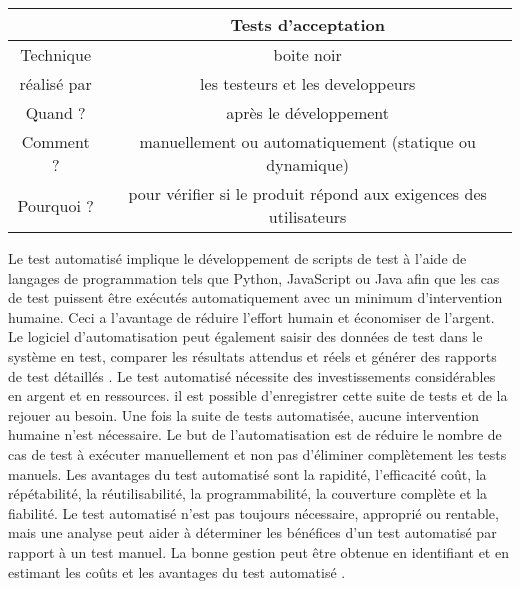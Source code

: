 \label{sec:criteres}
\begin{center}
    

\begin{tabular}{|c|c|}
    
    \hline
    \hline
    & Tests d'acceptation  \\ \hline
    Technique & boite noir \\ \hline
    réalisé par & les testeurs et les developpeurs \\ \hline
    Quand ? & après le développement \\ \hline
    Comment ? & manuellement ou automatiquement (statique ou dynamique) \\ \hline
    Pourquoi ? & pour vérifier si le produit répond aux exigences des utilisateurs \\ \hline
    \hline
\end{tabular}
\end{center}
Le test automatisé implique le développement de scripts de test à l'aide de langages de programmation tels que Python, JavaScript ou Java afin que les cas de test puissent être exécutés automatiquement avec un minimum d'intervention humaine. Ceci a l'avantage de réduire l'effort humain et économiser de l'argent. Le logiciel d'automatisation peut également saisir des données de test dans le système en test, comparer les résultats attendus et réels et générer des rapports de test détaillés \parencite{automation}. Le test automatisé nécessite des investissements considérables en argent et en ressources.  il est possible d'enregistrer cette suite de tests et de la rejouer au besoin. Une fois la suite de tests automatisée, aucune intervention humaine n'est nécessaire. Le but de l'automatisation est de réduire le nombre de cas de test à exécuter manuellement et non pas d'éliminer complètement les tests manuels. Les avantages du test automatisé sont la rapidité, l'efficacité coût, la répétabilité, la réutilisabilité, la programmabilité, la couverture complète et la fiabilité. Le test automatisé n'est pas toujours nécessaire, approprié ou rentable, mais une analyse peut aider à déterminer les bénéfices d'un test automatisé par rapport à un test manuel. La bonne gestion peut être obtenue en identifiant et en estimant les coûts et les avantages du test automatisé \parencite{automation2}.

